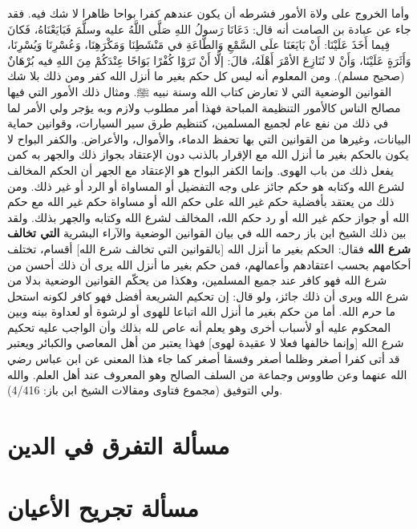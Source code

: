 وأما الخروج على ولاة الأمور فشرطه أن يكون عندهم كفرا بواحا ظاهرا لا شك فيه. فقد جاء عن عبادة بن الصامت أنه قال: دَعَانَا رَسولُ اللهِ صَلَّى اللَّهُ عليه وسلَّمَ فَبَايَعْنَاهُ، فَكانَ فِيما أَخَذَ عَلَيْنَا: أَنْ بَايَعَنَا علَى السَّمْعِ وَالطَّاعَةِ في مَنْشَطِنَا وَمَكْرَهِنَا، وَعُسْرِنَا وَيُسْرِنَا، وَأَثَرَةٍ عَلَيْنَا، وَأَنْ لا نُنَازِعَ الأمْرَ أَهْلَهُ، قالَ: إلَّا أَنْ تَرَوْا كُفْرًا بَوَاحًا عِنْدَكُمْ مِنَ اللهِ فيه بُرْهَانٌ {\footnotesize (صحيح مسلم)}. ومن المعلوم أنه ليس كل حكم بغير ما أنزل الله كفر ومن ذلك بلا شك القوانين الوضعية التي لا تعارض كتاب الله وسنة نبيه ﷺ. ومثال ذلك الأمور التي فيها مصالح الناس كالأمور التنظيمة المباحة فهذا أمر مطلوب ولازم وبه يؤجر ولي الأمر لما في ذلك من نفع عام لجميع المسلمين، كتنظيم طرق سير السيارات، وقوانين حماية البيانات، وغيرها من القوانين التي بها تحفظ الدماء، والأموال، والأعراض. والكفر البواح لا يكون بالحكم بغير ما أنزل الله مع الإقرار بالذنب دون الإعتقاد بجواز ذلك والجهر به كمن يفعل ذلك من باب الهوى. وإنما الكفر البواح هو الإعتقاد مع الجهر أن الحكم المخالف لشرع الله وكتابه هو حكم جائز على وجه التفضيل أو المساواة أو الرد أو غير ذلك. ومن ذلك من يعتقد بأفضلية حكم غير الله على حكم الله أو مساواة حكم غير الله مع حكم الله أو جواز حكم غير الله أو رد حكم الله، المخالف لشرع الله وكتابه والجهر بذلك. ولقد بين ذلك الشيخ ابن باز رحمه الله في بيان القوانين الوضعية والآراء البشرية \textbf{التي تخالف شرع الله} فقال: الحكم بغير ما أنزل الله [بالقوانين التي تخالف شرع الله] أقسام، تختلف أحكامهم بحسب اعتقادهم وأعمالهم، فمن حكم بغير ما أنزل الله يرى أن ذلك أحسن من شرع الله فهو كافر عند جميع المسلمين، وهكذا من يحكّم القوانين الوضعية بدلا من شرع الله ويرى أن ذلك جائز، ولو قال: إن تحكيم الشريعة أفضل فهو كافر لكونه استحل ما حرم الله. أما من حكم بغير ما أنزل الله اتباعا للهوى أو لرشوة أو لعداوة بينه وبين المحكوم عليه أو لأسباب أخرى وهو يعلم أنه عاص لله بذلك وأن الواجب عليه تحكيم شرع الله [وإنما خالفها فعلا لا عقيدة لهوى] فهذا يعتبر من أهل المعاصي والكبائر ويعتبر قد أتى كفرا أصغر وظلما أصغر وفسقا أصغر كما جاء هذا المعنى عن ابن عباس رضي الله عنهما وعن طاووس وجماعة من السلف الصالح وهو المعروف عند أهل العلم. والله ولي التوفيق {\footnotesize (مجموع فتاوى ومقالات الشيخ ابن باز: 4/416)}. 

\section{مسألة التفرق في الدين }
\label{sec:app_division}




\section{مسألة تجريح الأعيان}
\label{sec:app_division}

